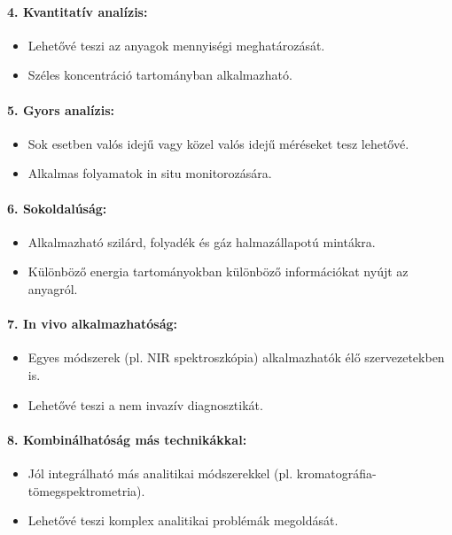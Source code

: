 \documentclass[a4paper,12pt]{article}
\begin{document}
\paragraph{4. Kvantitatív analízis:} \begin{itemize} \item Lehetővé teszi az anyagok mennyiségi meghatározását. \item Széles koncentráció tartományban alkalmazható. \end{itemize}

\paragraph{5. Gyors analízis:} \begin{itemize} \item Sok esetben valós idejű vagy közel valós idejű méréseket tesz lehetővé. \item Alkalmas folyamatok in situ monitorozására. \end{itemize}

\paragraph{6. Sokoldalúság:} \begin{itemize} \item Alkalmazható szilárd, folyadék és gáz halmazállapotú mintákra. \item Különböző energia tartományokban különböző információkat nyújt az anyagról. \end{itemize}

\paragraph{7. In vivo alkalmazhatóság:} \begin{itemize} \item Egyes módszerek (pl. NIR spektroszkópia) alkalmazhatók élő szervezetekben is. \item Lehetővé teszi a nem invazív diagnosztikát. \end{itemize}

\paragraph{8. Kombinálhatóság más technikákkal:} \begin{itemize} \item Jól integrálható más analitikai módszerekkel (pl. kromatográfia-tömegspektrometria). \item Lehetővé teszi komplex analitikai problémák megoldását. \end{itemize}
\end{document}
